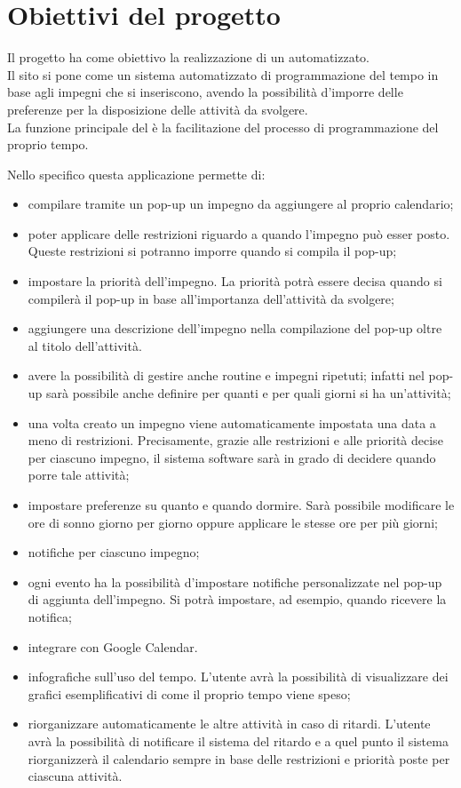 \section{Obiettivi del progetto}
Il progetto ha come obiettivo la realizzazione di un \nome automatizzato.\\
Il sito si pone come un sistema automatizzato di programmazione del tempo in base agli impegni che si inseriscono, avendo la possibilità d'imporre delle preferenze per la disposizione delle attività da svolgere.\\
La funzione principale del \nome è la facilitazione del processo di programmazione del proprio tempo.

\vspace{0.5cm}

Nello specifico questa applicazione permette di:
\begin{itemize}
    \item compilare tramite un pop-up un impegno da aggiungere al proprio calendario; 
    \item poter applicare delle restrizioni riguardo a quando l'impegno può esser posto. Queste
    restrizioni si potranno imporre quando si compila il pop-up;
    \item impostare la priorità dell'impegno. La priorità potrà essere decisa quando si compilerà il pop-up in base all'importanza dell'attività da svolgere;
    \item aggiungere una descrizione dell'impegno nella compilazione del pop-up oltre al titolo dell'attività.
    \item avere la possibilità di gestire anche routine e impegni ripetuti; infatti nel pop-up sarà possibile anche 
    definire per quanti e per quali giorni si ha un'attività;
    \item una volta creato un impegno viene automaticamente impostata una data a meno di restrizioni. Precisamente, grazie alle restrizioni e alle priorità decise per ciascuno
    impegno, il sistema software sarà in grado di decidere quando porre tale attività;
    \item impostare preferenze su quanto e quando dormire. Sarà possibile modificare le ore di sonno giorno per giorno oppure
    applicare le stesse ore per più giorni;
    \item notifiche per ciascuno impegno;
    \item ogni evento ha la possibilità d'impostare notifiche personalizzate nel pop-up di aggiunta dell'impegno. Si potrà impostare, ad esempio, quando ricevere
    la notifica;
    \item integrare con Google Calendar.
    \item infografiche sull'uso del tempo. L'utente avrà la possibilità di visualizzare dei grafici esemplificativi di come il proprio
    tempo viene speso;
    \item riorganizzare automaticamente le altre attività in caso di ritardi. L'utente avrà la possibilità di notificare il sistema del ritardo e 
    a quel punto il sistema riorganizzerà il calendario sempre in base delle restrizioni e priorità poste per ciascuna attività.
\end{itemize}

